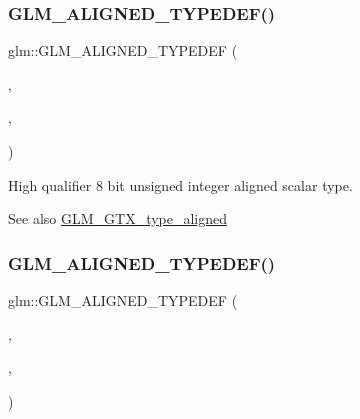 \subsubsection{\texorpdfstring{G\+L\+M\+\_\+\+A\+L\+I\+G\+N\+E\+D\+\_\+\+T\+Y\+P\+E\+D\+E\+F()}{GLM\_ALIGNED\_TYPEDEF()}\hspace{0.1cm}{\footnotesize\ttfamily [93/209]}}
{\footnotesize\ttfamily glm\+::\+G\+L\+M\+\_\+\+A\+L\+I\+G\+N\+E\+D\+\_\+\+T\+Y\+P\+E\+D\+EF (\begin{DoxyParamCaption}\item[{\mbox{\hyperlink{group__gtc__type__precision_ga2c27c6dd26e893786f04b10f99c1ee95}{highp\+\_\+uint8}}}]{,  }\item[{aligned\+\_\+highp\+\_\+uint8}]{,  }\item[{1}]{ }\end{DoxyParamCaption})}

High qualifier 8 bit unsigned integer aligned scalar type. \begin{DoxySeeAlso}{See also}
\mbox{\hyperlink{group__gtx__type__aligned}{G\+L\+M\+\_\+\+G\+T\+X\+\_\+type\+\_\+aligned}} 
\end{DoxySeeAlso}
\mbox{\label{group__gtx__type__aligned_ga447848a817a626cae08cedc9778b331c}} 
\subsubsection{\texorpdfstring{G\+L\+M\+\_\+\+A\+L\+I\+G\+N\+E\+D\+\_\+\+T\+Y\+P\+E\+D\+E\+F()}{GLM\_ALIGNED\_TYPEDEF()}\hspace{0.1cm}{\footnotesize\ttfamily [94/209]}}
{\footnotesize\ttfamily glm\+::\+G\+L\+M\+\_\+\+A\+L\+I\+G\+N\+E\+D\+\_\+\+T\+Y\+P\+E\+D\+EF (\begin{DoxyParamCaption}\item[{\mbox{\hyperlink{group__gtc__type__precision_ga4d32967d45ba8365e2a05eaaac85e978}{highp\+\_\+uint16}}}]{,  }\item[{aligned\+\_\+highp\+\_\+uint16}]{,  }\item[{2}]{ }\end{DoxyParamCaption})}

